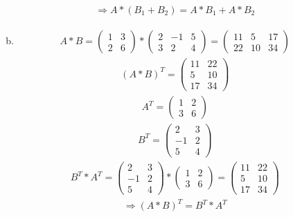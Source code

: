 \documentclass[a4paper]{scrartcl}
\begin{document}
\begin{enumerate}
\begin{enumerate}[a)]
\begin{align*}
\Rightarrow A*(B_1 + B_2) = A*B_1+A*B_2
\end{align*}

\item
\begin{align*}
A*B =
\begin{pmatrix}
1 & 3 \\
2 & 6
\end{pmatrix}
*
\begin{pmatrix}
2 & -1 & 5 \\
3 & 2 & 4
\end{pmatrix}
=
\begin{pmatrix}
11 & 5 & 17 \\
22 & 10 & 34
\end{pmatrix}
\end{align*}
\begin{align*}
(A*B)^T =
\begin{pmatrix}
11 & 22 \\
5 & 10 \\
17 & 34
\end{pmatrix}
\end{align*}
\begin{align*}
A^T =
\begin{pmatrix}
1 & 2 \\
3 & 6
\end{pmatrix}
\end{align*}
\begin{align*}
B^T =
\begin{pmatrix}
2 & 3 \\
-1 & 2 \\
5 & 4 
\end{pmatrix}
\end{align*}
\begin{align*}
B^T*A^T =
\begin{pmatrix}
2 & 3 \\
-1 & 2 \\
5 & 4 
\end{pmatrix}
*
\begin{pmatrix}
1 & 2 \\
3 & 6
\end{pmatrix}
=
\begin{pmatrix}
11 & 22 \\
5 & 10 \\
17 & 34
\end{pmatrix}
\end{align*}
\begin{align*}
\Rightarrow (A*B)^T = B^T*A^T
\end{align*} 


\end{enumerate}
\end{enumerate}
\end{document}
